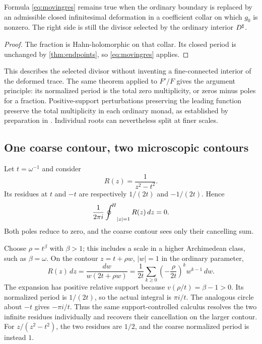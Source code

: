 \documentclass[11pt,letterpaper]{article}
\theoremstyle{definition}
\theoremstyle{remark}
\numberwithin{equation}{section}
\begin{document}
\begin{corollary}\label{cor:deformedres}
Formula \eqref{eq:movingres} remains true when the ordinary boundary is replaced by an admissible closed infinitesimal deformation in a coefficient collar on which $g_0$ is nonzero. The right side is still the divisor selected by the ordinary interior $D^{\sharp}$.
\end{corollary}
\begin{proof}
The fraction is Hahn-holomorphic on that collar. Its closed period is unchanged by \cref{thm:endpoints}, so \eqref{eq:movingres} applies.
\end{proof}

This describes the selected divisor without inventing a fine-connected interior of the deformed trace. The same theorem applied to $F'/F$ gives the argument principle: its normalized period is the total zero multiplicity, or zeros minus poles for a fraction. Positive-support perturbations preserving the leading function preserve the total multiplicity in each ordinary monad, as established by preparation in \cite{Analysis,Geometry}. Individual roots can nevertheless split at finer scales.

\subsection{One coarse contour, two microscopic contours}
\begin{example}\label{ex:cluster}
Let $t=\omega^{-1}$ and consider
\[
 R(z)=\frac1{z^2-t^2}.
\]
Its residues at $t$ and $-t$ are respectively $1/(2t)$ and $-1/(2t)$. Hence
\[
 \frac1{2\pi i}\mathop{\oint^{\!H}}\nolimits_{|z|=1}R(z)\,dz=0.
\]
Both poles reduce to zero, and the coarse contour sees only their cancelling sum.

Choose $\rho=t^\beta$ with $\beta>1$; this includes a scale in a higher Archimedean class, such as $\beta=\omega$. On the contour $z=t+\rho w$, $|w|=1$ in the ordinary parameter,
\begin{equation}\label{eq:clusterpullback}
 R(z)\,dz=\frac{dw}{w(2t+\rho w)}
 =\frac1{2t}\sum_{k\ge0}
       \left(-\frac{\rho}{2t}\right)^k w^{k-1}\,dw.
\end{equation}
The expansion has positive relative support because $v(\rho/t)=\beta-1>0$. Its normalized period is $1/(2t)$, so the actual integral is $\pi i/t$. The analogous circle about $-t$ gives $-\pi i/t$. Thus the same support-controlled calculus resolves the two infinite residues individually and recovers their cancellation on the larger contour. For $z/(z^2-t^2)$, the two residues are $1/2$, and the coarse normalized period is instead $1$.
\end{example}
\end{document}
